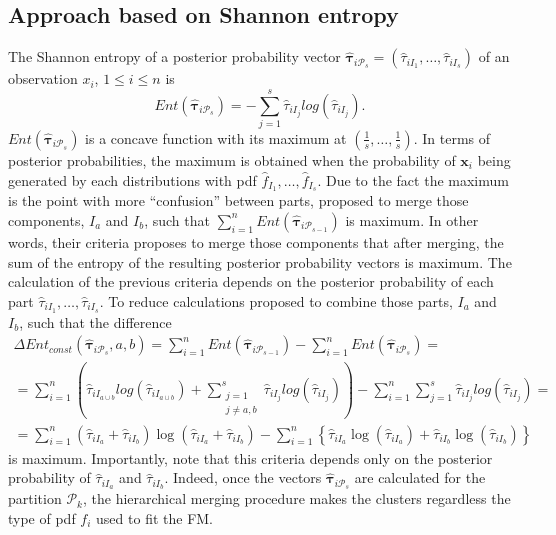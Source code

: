 \documentclass[10pt, a4paper]{article}
\newcommand{\m}[1]{\boldsymbol{#1}}
\begin{document}
\begin{spacing}{1.9}
\subsection{Approach based on Shannon entropy}

The Shannon entropy of a posterior probability vector $\hat{\m\tau}_{i \mathcal{P}_s} = \left( \hat{\tau}_{i I_1} , \dots, \hat{\tau}_{i I_s}  \right)$ of an observation $x_i$, $1 \leq i \leq n$ is
\[
Ent( \hat{\m \tau}_{i \mathcal{P}_s} ) = - \sum_{j=1}^s \hat{\tau}_{i I_j}  log(\hat{\tau}_{i I_j} ).
\]
$Ent( \hat{\m \tau}_{i \mathcal{P}_s} )$ is a concave function with its maximum at $(\frac{1}{s},\dots,\frac{1}{s})$. In terms of posterior probabilities, the maximum is obtained when the probability of $\m x_i$ being generated by each distributions with pdf $\hat{f}_{I_1}, \dots, \hat{f}_{I_s}$. Due to the fact the maximum is the point with more ``confusion'' between parts, \cite{baudry2010combining} proposed to merge those components, $I_a$ and $I_b$, such that $\sum_{i=1}^n Ent( \hat{\m \tau}_{i \mathcal{P}_{s-1}} )$ is maximum. In other words, their criteria proposes to merge those components that after merging, the sum of the entropy of the resulting posterior probability vectors is maximum. The calculation of the previous criteria depends on the posterior probability of each part $\hat{\tau}_{i I_1}, \dots,\hat{\tau}_{i I_s}$. To reduce calculations \cite{baudry2010combining} proposed to combine those parts, $I_a$ and $I_b$, such that the difference
\begin{multline*}
\Delta Ent_{const}(\hat{\m \tau}_{i \mathcal{P}_s}, a, b) = \sum_{i=1}^n Ent( \hat{\m \tau}_{i \mathcal{P}_{s-1}}) - \sum_{i=1}^n Ent( \hat{\m \tau}_{i \mathcal{P}_s}) =  \\ = \sum_{i=1}^n  \left( \hat{\tau}_{i I_{a\cup b}}  log(\hat{\tau}_{i I_{a\cup b}} ) +  \sum_{\substack{j=1 \\
                                                            j \neq a, b}}^s \hat{\tau}_{i I_j}  log(\hat{\tau}_{i I_j} ) \right)  - \sum_{i=1}^n \sum_{j=1}^s \hat{\tau}_{i I_j}  log(\hat{\tau}_{i I_j} ) = \\  =   \sum_{i=1}^n  (\hat{\tau}_{i I_a}+\hat{\tau}_{i I_b}) \log(\hat{\tau}_{iI_a} + \hat{\tau}_{i I_b}) - \sum_{i=1}^n \left\{ \hat{\tau}_{i I_a} \log(\hat{\tau}_{i I_a}) + \hat{\tau}_{iI_b} \log(\hat{\tau}_{i I_b})\right\}
\end{multline*}
is maximum. Importantly, note that this criteria depends only on the posterior probability of $\hat{\tau}_{iI_a}$ and $\hat{\tau}_{iI_b}$. Indeed, once the vectors $\hat{\m\tau}_{i \mathcal{P}_s}$ are calculated for the partition $\mathcal{P}_k$, the hierarchical merging procedure makes the clusters regardless the type of pdf $f_i$ used to fit the FM.


\end{spacing}
\end{document}
